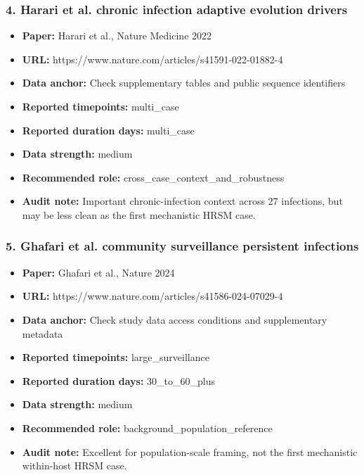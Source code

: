 \subsubsection*{4. Harari et al. chronic infection adaptive evolution drivers}
\begin{itemize}
\item \textbf{Paper:} Harari et al., Nature Medicine 2022
\item \textbf{URL:} https://www.nature.com/articles/s41591-022-01882-4
\item \textbf{Data anchor:} Check supplementary tables and public sequence identifiers
\item \textbf{Reported timepoints:} multi\_case
\item \textbf{Reported duration days:} multi\_case
\item \textbf{Data strength:} medium
\item \textbf{Recommended role:} cross\_case\_context\_and\_robustness
\item \textbf{Audit note:} Important chronic-infection context across 27 infections, but may be less clean as the first mechanistic HRSM case.
\end{itemize}

\subsubsection*{5. Ghafari et al. community surveillance persistent infections}
\begin{itemize}
\item \textbf{Paper:} Ghafari et al., Nature 2024
\item \textbf{URL:} https://www.nature.com/articles/s41586-024-07029-4
\item \textbf{Data anchor:} Check study data access conditions and supplementary metadata
\item \textbf{Reported timepoints:} large\_surveillance
\item \textbf{Reported duration days:} 30\_to\_60\_plus
\item \textbf{Data strength:} medium
\item \textbf{Recommended role:} background\_population\_reference
\item \textbf{Audit note:} Excellent for population-scale framing, not the first mechanistic within-host HRSM case.
\end{itemize}

